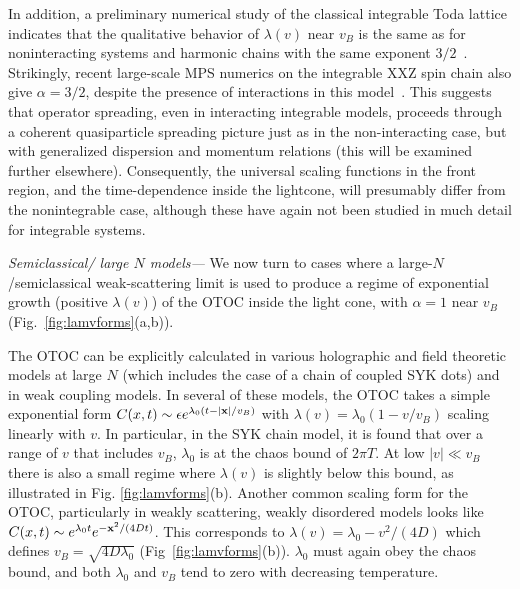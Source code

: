 \documentclass[aps,prl,reprint,superscriptaddress, longbibliography]{revtex4-1}
\newcommand{\vb}{v_B}
\begin{document}
In addition, a preliminary numerical study of the classical integrable Toda lattice indicates that the qualitative behavior of $\lambda(v)$ near $v_B$ is the same as for noninteracting systems and harmonic chains with the same exponent $3/2$~\cite{Dhar_unpublished}. Strikingly, recent large-scale MPS numerics on the integrable XXZ spin chain also give $\alpha=3/2$, despite the presence of interactions in this model~\cite{Swingle_otocMPS}. This suggests that operator spreading, even in interacting integrable models, proceeds through a coherent quasiparticle spreading picture just as in the non-interacting case, but with generalized dispersion and momentum relations (this will be examined further elsewhere). Consequently, the universal scaling functions in the front region, and the time-dependence inside the lightcone, will presumably differ from the nonintegrable case, although these have again not been studied in much detail for integrable systems.  

\emph{Semiclassical/ large $N$ models---}  We  now  turn to cases where a large-$N$/semiclassical weak-scattering limit is used to produce a regime of
exponential growth (positive $\lambda(v)$) of the OTOC inside the light cone, with  $\alpha = 1$ near $v_B$ (Fig.~\ref{fig:lamvforms}(a,b)).

The OTOC can be explicitly calculated in various holographic\cite{KitaevSYK,ShenkerStanfordButterfly,LocalizedShocks,CotlerRM,GuQiStanford} and field theoretic\cite{RobertsStanford,ChowdhuryON} models at large $N$ (which includes the case of a chain of coupled SYK dots\cite{GuQiStanford}) and in weak coupling models\cite{StanfordWeakCoupling,PatelDiffusiveMetal}. In several of these models, the OTOC  takes a simple exponential form ${C(x,t) \sim \epsilon e^{\lambda_0 (t- |{\bf x}|/\vb)}}$ with ${\lambda(v) = \lambda_0(1-v/v_B)}$ scaling linearly with $v$. In particular, in the SYK chain model\cite{GuQiStanford}, it is found that over a range of $v$ that includes $v_B$, $\lambda_0$ is at the chaos bound of $2\pi T$.  At low $|v| \ll v_B$ there is also a small regime where $\lambda(v)$ is slightly below this bound, as illustrated in Fig. \ref{fig:lamvforms}(b)\cite{GuQiStanford}.  Another common scaling form for the OTOC, particularly in weakly scattering, weakly disordered models looks like $C(x,t) \sim e^{\lambda_0 t} e^{-{\bf x}^2/(4Dt)}$\cite{PatelDiffusiveMetal}. This corresponds to $\lambda(v) = \lambda_0 -v^2/(4D)$ which defines $\vb = \sqrt{4D\lambda_0}$ (Fig~\ref{fig:lamvforms}(b)). $\lambda_0$ must again obey the chaos bound, and both $\lambda_0$ and $\vb$ tend to zero with decreasing temperature.
\end{document}

